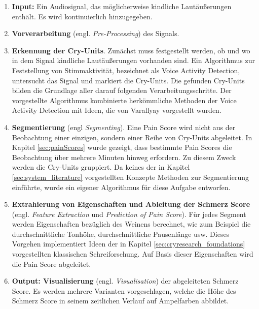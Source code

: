 \begin{enumerate}[leftmargin=*]
	\item \textbf{Input: } Ein Audiosignal, das möglicherweise kindliche Lautäußerungen enthält. Es wird kontinuierlich hinzugegeben.
	
	\item \textbf{Vorverarbeitung} (engl. \emph{Pre-Processing}) des Signals.
	
	\item \textbf{Erkennung der Cry-Units}. Zunächst muss festgestellt werden, ob und wo in dem Signal kindliche Lautäußerungen vorhanden sind. Ein Algorithmus zur Feststellung von Stimmaktivität, bezeichnet als Voice Activity Detection, untersucht das Signal und markiert die Cry-Units. Die gefunden Cry-Units bilden die Grundlage aller darauf folgenden Verarbeitungsschritte. Der vorgestellte Algorithmus kombinierte herkömmliche Methoden der Voice Activity Detection mit Ideen, die von Varallyay \cite{cry_thesis} vorgestellt wurden.
	
	\item \textbf{Segmentierung} (engl \emph{Segmenting}). Eine Pain Score wird nicht aus der Beobachtung einer einzigen, sondern einer Reihe von Cry-Units abgeleitet. In Kapitel \ref{sec:painScores} wurde gezeigt, dass bestimmte Pain Scores die Beobachtung über mehrere Minuten hinweg erfordern. Zu diesem Zweck werden die Cry-Units gruppiert. Da keines der in Kapitel \ref{sec:system_literature} vorgestellten Konzepte Methoden zur Segmentierung einführte, wurde ein eigener Algorithmus für diese Aufgabe entworfen.
	
	\item \textbf{Extrahierung von Eigenschaften und Ableitung der Schmerz Score} (engl. \emph{Feature Extraction} und \emph{Prediction of Pain Score}). Für jedes Segment werden Eigenschaften bezüglich des Weinens berechnet, wie zum Beispiel die durchschnittliche Tonhöhe, durchschnittliche Pausenlänge usw. Dieses Vorgehen implementiert Ideen der in Kapitel \ref{sec:cryresearch_foundations} vorgestellten klassischen Schreiforschung. Auf Basis dieser Eigenschaften wird die Pain Score abgeleitet.
	
	\item \textbf{Output: Visualisierung} (engl. \emph{Visualisation}) der abgeleiteten Schmerz Score. Es werden mehrere Varianten vorgeschlagen, welche die Höhe des Schmerz Score in seinem zeitlichen Verlauf auf Ampelfarben abbildet.
\end{enumerate}

